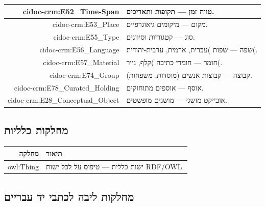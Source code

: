 \documentclass[12pt,a4paper]{article}
\newcommand{\en}[1]{\textenglish{\LR{#1}}}
\begin{document}
\begin{longtable}{|r|p{10cm}|}
cidoc-crm:E52\_Time-Span & 
טווח זמן — תקופות ותאריכים.\\
\hline

cidoc-crm:E53\_Place & 
מקום — מיקומים גיאוגרפיים.\\
\hline

cidoc-crm:E55\_Type & 
סוג — קטגוריות וסיווגים.\\
\hline

cidoc-crm:E56\_Language & 
שפה — שפות )עברית, ארמית, ערבית-יהודית(.\\
\hline

cidoc-crm:E57\_Material & 
חומר — חומרי כתיבה )קלף, נייר(.\\
\hline

cidoc-crm:E74\_Group & 
קבוצה — קבוצות אנשים (מוסדות, משפחות).\\
\hline

cidoc-crm:E78\_Curated\_Holding & 
אוסף — אוספים מתוחזקים.\\
\hline

cidoc-crm:E28\_Conceptual\_Object & 
אובייקט מושגי — מושגים מופשטים.\\
\hline
\end{longtable}

\subsection{מחלקות כלליות \en{(OWL/RDF)}}

\begin{longtable}{|r|p{10cm}|}
\hline
\textbf{מחלקה} & \textbf{תיאור} \\
\hline
\endhead

owl:Thing & ישות כללית — טיפוס על לכל ישות RDF/OWL.\\
\hline
\end{longtable}

\subsection{מחלקות ליבה לכתבי יד עבריים}
\end{document}
